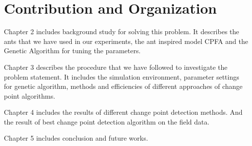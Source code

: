 \section{\label{section:Contribution and Organization}Contribution and Organization}
Chapter 2 includes background study for solving this problem. It describes the ants that we have used in our experiments, the ant inspired model CPFA and the Genetic Algorithm for tuning the parameters.\par
Chapter 3 describes the procedure that we have followed to investigate the problem statement. It includes the simulation environment, parameter settings for genetic algorithm, methods and efficiencies of different approaches of change point algorithms. \par
Chapter 4 includes the results of different change point detection methods. And the result of best change point detection algorithm on the field data. \par
Chapter 5 includes conclusion and future works. 

